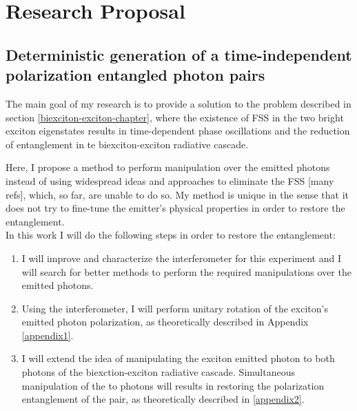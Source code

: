 \section{Research Proposal}
\subsection{Deterministic generation of a time-independent polarization entangled photon pairs}
The main goal of my research is to provide a solution to the problem described in section \ref{biexciton-exciton-chapter}, where the existence of FSS in the two bright exciton eigenstates results in time-dependent phase oscillations and the reduction of entanglement in te biexciton-exciton radiative cascade.
\iffalse
The presence of the splitting in the lowest excitonic state is an unwanted effect in QDs that causes a degradation in the degree of entanglement between the two photons in the biexciton-exciton radiative cascade by lifting the degeneracy of the levels\cite{Winik2017}. This is due to several causes but mainly as a result of the asymmetry of the QD.$\newline$
\fi
Here, I propose a method to perform manipulation over the emitted photons instead of using widespread ideas and approaches to eliminate the FSS [many refs], which, so far, are unable to do so. My method is unique in the sense that it does not try to fine-tune the emitter's physical properties in order to restore the entanglement.\\
In this work I will do the following steps in order to restore the entanglement:
\begin{enumerate}
	\item  I will improve and characterize the interferometer for this experiment and I will search for better methods to perform the required manipulations over the emitted photons. 
	\item Using the interferometer, I will perform unitary rotation of the exciton's emitted photon polarization,  as theoretically described in Appendix \ref{appendix1}.
	\item I will extend the idea of manipulating the exciton emitted photon to both photons of the biexction-exciton radiative cascade. Simultaneous manipulation of the to photons will results in restoring the polarization entanglement of the pair, as theoretically described in \ref{appendix2}.
\end{enumerate} 

